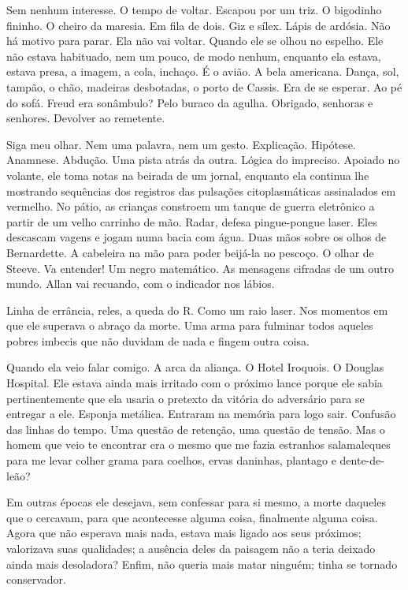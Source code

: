 Sem nenhum interesse. O tempo de voltar. Escapou por um triz. O
bigodinho fininho. O cheiro da maresia. Em fila de dois. Giz e sílex.
Lápis de ardósia. Não há motivo para parar. Ela não vai voltar. Quando
ele se olhou no espelho. Ele não estava habituado, nem um pouco, de modo
nenhum, enquanto ela estava, estava presa, a imagem, a cola, inchaço. É
o avião. A bela americana. Dança, sol, tampão, o chão, madeiras
desbotadas, o porto de Cassis. Era de se esperar. Ao pé do sofá. Freud
era sonâmbulo? Pelo buraco da agulha. Obrigado, senhoras e senhores.
Devolver ao remetente.

Siga meu olhar. Nem uma palavra, nem um gesto. Explicação. Hipótese.
Anamnese. Abdução. Uma pista atrás da outra. Lógica do impreciso.
Apoiado no volante, ele toma notas na beirada de um jornal, enquanto ela
continua lhe mostrando sequências dos registros das pulsações
citoplasmáticas assinalados em vermelho. No pátio, as crianças constroem
um tanque de guerra eletrônico a partir de um velho carrinho de mão.
Radar, defesa pingue-pongue laser. Eles descascam vagens e jogam numa
bacia com água. Duas mãos sobre os olhos de Bernardette. A cabeleira na
mão para poder beijá-la no pescoço. O olhar de Steeve. Va entender! Um
negro matemático. As mensagens cifradas de um outro mundo. Allan vai
recuando, com o indicador nos lábios.

Linha de errância, reles, a queda do R. Como um raio laser. Nos momentos
em que ele superava o abraço da morte. Uma arma para fulminar todos
aqueles pobres imbecis que não duvidam de nada e fingem outra coisa.

Quando ela veio falar comigo. A arca da aliança. O Hotel Iroquois. O
Douglas Hospital. Ele estava ainda mais irritado com o próximo lance
porque ele sabia pertinentemente que ela usaria o pretexto da vitória do
adversário para se entregar a ele. Esponja metálica. Entraram na memória
para logo sair. Confusão das linhas do tempo. Uma questão de retenção,
uma questão de tensão. Mas o homem que veio te encontrar era o mesmo que
me fazia estranhos salamaleques para me levar colher grama para coelhos,
ervas daninhas, plantago e dente-de-leão?

Em outras épocas ele desejava, sem confessar para si mesmo, a morte
daqueles que o cercavam, para que acontecesse alguma coisa, finalmente
alguma coisa. Agora que não esperava mais nada, estava mais ligado aos
seus próximos; valorizava suas qualidades; a ausência deles da paisagem
não a teria deixado ainda mais desoladora? Enfim, não queria mais matar
ninguém; tinha se tornado conservador.

